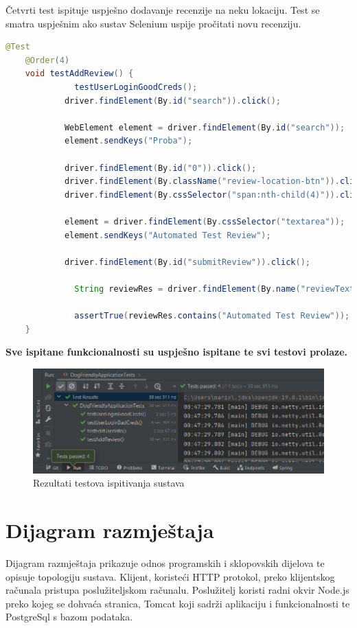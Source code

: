     Četvrti test ispituje uspješno dodavanje recenzije na neku lokaciju. Test se smatra uspješnim ako sustav Selenium uspije pročitati novu recenziju.

    \begin{lstlisting}[language=Java,breaklines=true]
    @Test
    @Order(4)
    void testAddReview() {
		      testUserLoginGoodCreds();
    		driver.findElement(By.id("search")).click();
    
    		WebElement element = driver.findElement(By.id("search"));
    		element.sendKeys("Proba");
    
    		driver.findElement(By.id("0")).click();
    		driver.findElement(By.className("review-location-btn")).click();
    		driver.findElement(By.cssSelector("span:nth-child(4)")).click();
    
    		element = driver.findElement(By.cssSelector("textarea"));
    		element.sendKeys("Automated Test Review");
    
    		driver.findElement(By.id("submitReview")).click();
    
		      String reviewRes = driver.findElement(By.name("reviewText")).getAttribute("innerHTML");

		      assertTrue(reviewRes.contains("Automated Test Review"));
    }
    \end{lstlisting}

    \textbf{Sve ispitane funkcionalnosti su uspješno ispitane te svi testovi prolaze.}

    \begin{figure}[H]
        \includegraphics[width=\textwidth]{img/TestSuccess4.png}
        \centering
        \caption{Rezultati testova ispitivanja sustava}
    \end{figure}

    \eject
    \section{Dijagram razmještaja}

    Dijagram razmještaja prikazuje odnos programskih i sklopovskih dijelova te opisuje topologiju sustava. Klijent, koristeći HTTP protokol, preko klijentskog računala pristupa poslužiteljskom računalu. Poslužitelj koristi radni okvir Node.js preko kojeg se dohvaća stranica, Tomcat koji sadrži aplikaciju i funkcionalnosti te PostgreSql s bazom podataka.

